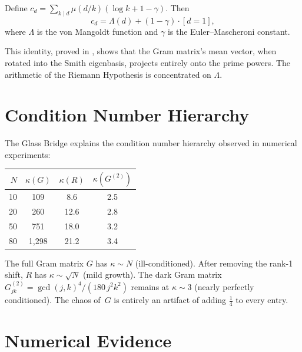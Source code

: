 \documentclass[11pt,a4paper]{article}
\begin{document}
\begin{theorem}
\label{thm:vm-bridge}
Define $c_d = \sum_{k \mid d} \mu(d/k)(\log k + 1 - \gamma)$.
Then
\[
  c_d = \Lambda(d) + (1 - \gamma)\cdot[d = 1],
\]
where $\Lambda$ is the von Mangoldt function and $\gamma$ is the
Euler--Mascheroni constant.
\end{theorem}

\noindent
This identity, proved in , shows that
the Gram matrix's mean vector, when rotated into the Smith
eigenbasis, projects entirely onto the prime powers. The arithmetic
of the Riemann Hypothesis is concentrated on $\Lambda$.

\section{Condition Number Hierarchy}
\label{sec:condition}

The Glass Bridge explains the condition number hierarchy observed
in numerical experiments:

\begin{center}
\begin{tabular}{@{}rccc@{}}
\toprule
$N$ & $\kappa(G)$ & $\kappa(R)$ & $\kappa(G^{(2)})$ \\
\midrule
10 & 109 & 8.6 & 2.5 \\
20 & 260 & 12.6 & 2.8 \\
50 & 751 & 18.0 & 3.2 \\
80 & 1{,}298 & 21.2 & 3.4 \\
\bottomrule
\end{tabular}
\end{center}

\noindent
The full Gram matrix $G$ has $\kappa \sim N$ (ill-conditioned).
After removing the rank-1 shift, $R$ has $\kappa \sim \sqrt{N}$
(mild growth). The dark Gram matrix $G^{(2)}_{jk} =
\gcd(j,k)^4/(180\,j^2 k^2)$ remains at $\kappa \sim 3$
(nearly perfectly conditioned). The chaos of~$G$ is entirely
an artifact of adding $\frac{1}{4}$ to every entry.

\section{Numerical Evidence}
\label{sec:numerics}
\end{document}
